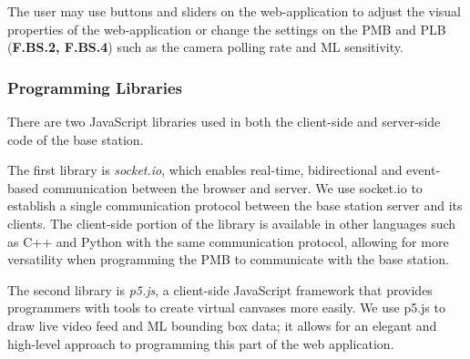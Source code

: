The user may use buttons and sliders on the web-application to adjust the visual properties of the web-application or change the settings on the PMB and PLB (\textbf{F.BS.2, F.BS.4}) such as the camera polling rate and ML sensitivity.

\subsubsection{Programming Libraries}

There are two JavaScript libraries used in both the client-side and server-side code of the base station.

The first library is \textit{socket.io}, which enables real-time, bidirectional and event-based communication between the browser and server. We use socket.io to establish a single communication protocol between the base station server and its clients. The client-side portion of the library is available in other languages such as C++ and Python with the same communication protocol, allowing for more versatility when programming the PMB to communicate with the base station. 

The second library is \textit{p5.js}, a client-side JavaScript framework that provides programmers with tools to create virtual canvases more easily. We use p5.js to draw live video feed and ML bounding box data; it allows for an elegant and high-level approach to programming this part of the web application.
